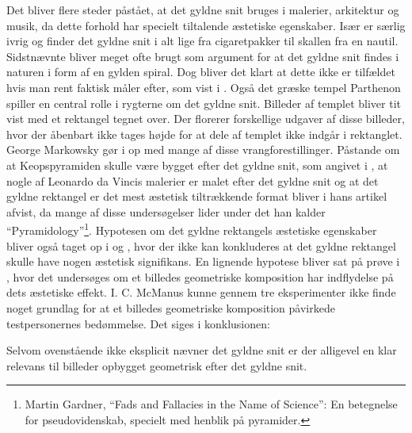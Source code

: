 {
Det bliver flere steder påstået, at det gyldne snit bruges i malerier,
arkitektur og musik, da dette forhold har specielt tiltalende æstetiske
egenskaber\cite{GoldenNumber}\cite{RatioArt}\cite{Putz1995}\cite{Stakhov2006490}\cite{Boussora2004}.
Især \cite{GoldenNumber} er særlig ivrig og finder det gyldne snit i alt
lige fra cigaretpakker til skallen fra en nautil. Sidstnævnte bliver
meget ofte brugt som argument for at det gyldne snit findes i naturen i
form af en gylden spiral. Dog bliver det klart at dette ikke er
tilfældet hvis man rent faktisk måler efter, som vist i
\cite{Sharp2002}. Også det græske tempel Parthenon spiller en central
rolle i rygterne om det gyldne snit. Billeder af templet bliver tit vist
med et rektangel tegnet over. Der florerer forskellige udgaver af disse
billeder, hvor der åbenbart ikke tages højde for at dele af templet ikke
indgår i rektanglet. George Markowsky gør i \cite{Markowsky1992} op med
mange af disse vrangforestillinger. Påstande om at Keopspyramiden skulle
være bygget efter det gyldne snit, som angivet i \cite{Stakhov2006490},
at nogle af Leonardo da Vincis malerier er malet efter det gyldne
snit og at det gyldne rektangel er det mest æstetisk tiltrækkende
format\cite{GoldenNumber}\cite{RatioArt} bliver i hans artikel afvist,
da mange af disse undersøgelser lider under det han kalder
``Pyramidology''\footnote{Martin Gardner, ``Fads and Fallacies in the
Name of Science'': En betegnelse for pseudovidenskab, specielt
med henblik på pyramider.}. Hypotesen om det gyldne rektangels æstetiske
egenskaber bliver også taget op i \cite{Boselie1984} og \cite{Plug1980},
hvor der ikke kan konkluderes at det gyldne rektangel skulle have nogen
æstetisk signifikans. En lignende hypotese bliver sat på prøve i
\cite{McManus1995}, hvor det undersøges om et billedes geometriske
komposition har indflydelse på dets æstetiske effekt. I. C. McManus
kunne gennem tre eksperimenter ikke finde noget grundlag for at et billedes
geometriske komposition påvirkede testpersonernes bedømmelse. Det siges
i konklusionen:


Selvom ovenstående ikke eksplicit nævner det gyldne snit er der
alligevel en klar relevans til billeder opbygget geometrisk efter det
gyldne snit.
}
